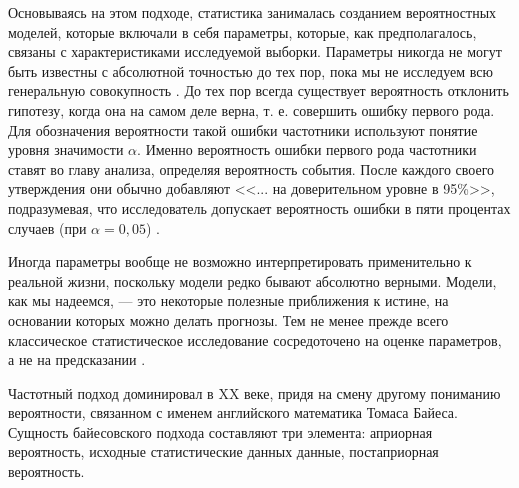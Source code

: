 Основываясь на этом подходе, статистика занималась созданием вероятностных моделей, которые включали в себя параметры, которые, как предполагалось, связаны с характеристиками исследуемой выборки. Параметры никогда не могут быть известны с абсолютной точностью до тех пор, пока мы не исследуем всю генеральную совокупность \cite[стр. 1]{Christensen2010}. До тех пор всегда существует вероятность отклонить гипотезу, когда она на самом деле верна, т. е. совершить ошибку первого рода. Для обозначения вероятности такой ошибки частотники используют понятие уровня значимости $\alpha$. Именно вероятность ошибки первого рода частотники ставят во главу анализа, определяя вероятность события. После каждого своего утверждения они обычно добавляют <<... на доверительном уровне в 95\%>>, подразумевая, что исследователь допускает вероятность ошибки в пяти процентах случаев (при $\alpha = 0,05$) \cite[стр. 10-11]{handbook_stat_dm}.

Иногда параметры вообще не возможно интерпретировать применительно к реальной жизни, поскольку модели редко бывают абсолютно верными. Модели, как мы надеемся, --- это некоторые полезные приближения к истине, на основании которых можно делать прогнозы. Тем не менее прежде всего классическое статистическое исследование  сосредоточено на оценке параметров, а не на предсказании \cite[стр. 1]{Christensen2010}.


Частотный подход доминировал в XX веке, придя на смену другому пониманию вероятности, связанном с именем английского математика Томаса Байеса\cite[стр. 2]{Efron2005}. Сущность байесовского подхода составляют три элемента: априорная вероятность, исходные статистические данных данные, постаприорная вероятность.

